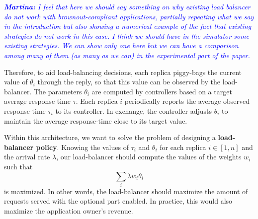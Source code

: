\textcolor{blue}{\textit{\textbf{Martina:} I feel that here we should
    say something on why existing load balancer do not work with
    brownout-compliant applications, partially repeating what we say
    in the introduction but also showing a numerical example of the
    fact that existing strategies do not work in this case. I think we
    should have in the simulator some existing strategies. We can show
    only one here but we can have a comparison among many of them (as
    many as we can) in the experimental part of the paper.}}

Therefore, to aid load-balancing decisions, each replica piggy-bags
the current value of $\theta_i$ through the reply, so that this value
can be observed by the load-balancer. The parameters $\theta_i$ are
computed by controllers based on a target average response time
$\bar{\tau}$. Each replica $i$ periodically reports the average
observed response-time $\tau_i$ to its controller. In exchange, the
controller adjusts $\theta_i$ to maintain the average response-time
close to its target value.

Within this architecture, we want to solve the problem of designing a
{\bf load-balancer policy}. Knowing the values of $\tau_i$ and
$\theta_i$ for each replica $i \in [1, n]$ and the arrival rate
$\lambda$, our load-balancer should compute the values of the weights
$w_i$ such that
\begin{equation}
\sum_{i} \lambda w_i \theta_i
\end{equation}
is maximized. In other words, the load-balancer should maximize the
amount of requests served with the optional part enabled. In practice,
this would also maximize the application owner's revenue.

